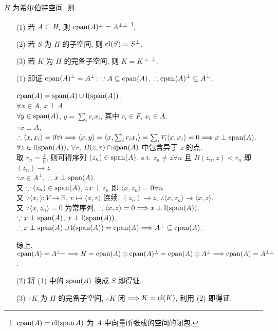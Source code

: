 \documentclass{note}
\begin{document}
\begin{thm}[(课本定理 13.13)]
    $H$ 为希尔伯特空间, 则
    \begin{itemize}
        \item[(1)] 若 $A\subseteq H$, 则 $\operatorname{cpan}(A)^{\perp}=A^{\perp\perp}~$\footnote{$\operatorname{cpan}(A)=\operatorname{cl}(\operatorname{span}{A})$ 为 $A$ 中向量所张成的空间的闭包.}.
        \item[(2)] 若 $S$ 为 $H$ 的子空间, 则 $\operatorname{cl}(S)=S^{\perp}$.
        \item[(3)] 若 $K$ 为 $H$ 的完备子空间, 则 $K=K^{\perp\perp}$.
    \end{itemize}
\end{thm}
\begin{pf}
    \begin{itemize}
        \item[(1)] 即证 $\operatorname{cpan}(A)^{\perp}=A^{\perp}$: $\because A\subseteq\operatorname{cpan}(A)$, $\therefore\operatorname{cpan}(A)^{\perp}\subseteq A^{\perp}$.

        $\operatorname{cpan}(A)=\operatorname{span}(A)\cup\operatorname{l}(\operatorname{span}(A))$.\\
        $\forall x\in A$, $x\perp A$.\\
        $\forall y\in\operatorname{span}(A)$, $y=\sum_ir_ix_i$, 其中 $r_i\in F$, $x_i\in A$.\\
        $\because x\perp A$, $\therefore\langle x,x_i\rangle=0\forall i\Longrightarrow\langle x,y\rangle=\langle x,\sum_ir_ix_i\rangle=\sum_i\overline{r_i}\langle x,x_i\rangle=0\Longrightarrow x\perp\operatorname{span}(A)$.\\
        $\forall z\in\operatorname{l}(\operatorname{span}(A))$, $\forall r$, $B(z,r)\cap\operatorname{span}(A)$ 中包含异于 $z$ 的点.\\
        取 $r_n=\frac{1}{n}$, 则可得序列 $(z_n)\in\operatorname{span}(A)$. s.t. $z_n\neq z\forall n$ 且 $B(z_n,z)<r_n$ 即 $(z_n)\rightarrow z$.\\
        $\because x\in A^{\perp}$, $\therefore x\perp\operatorname{span}(A)$.\\
        又 $\because(z_n)\in\operatorname{span}(A)$, $\therefore x\perp z_n$ 即 $\langle x,z_n\rangle=0\forall n$.\\
        又 $\because\langle x,\rangle:V\rightarrow\mathbb{R}$, $v\mapsto\langle x,v\rangle$ 连续, $(z_n)\rightarrow z$, $\therefore\langle x,z_n\rangle\rightarrow\langle x,z\rangle$.\\
        又 $\because\langle x,z_n\rangle=0$ 为常序列, $\therefore\langle x,z\rangle=0\Longrightarrow x\perp\operatorname{l}(\operatorname{span}(A))$.\\
        $\because x\perp\operatorname{span}(A)$, $x\perp\operatorname{l}(\operatorname{span}(A))$, $\therefore x\perp\operatorname{span}(A)\cup\operatorname{l}(\operatorname{span}(A))=\operatorname{cpan}(A)\Longrightarrow A^{\perp}\subseteq\operatorname{cpan}(A)$.

        综上, $\operatorname{cpan}(A)=A^{\perp\perp}\Longrightarrow H=\operatorname{cpan}(A)\odot\operatorname{cpan}(A)^{\perp}=\operatorname{cpan}(A)\odot A^{\perp}\Longrightarrow\operatorname{cpan}(A)=A^{\perp\perp}$.
        \item[(2)] 将 (1) 中的 $\operatorname{span}(A)$ 换成 $S$ 即得证.
        \item[(3)] $\because K$ 为 $H$ 的完备子空间, $\therefore K$ 闭 $\Longrightarrow K=\operatorname{cl}(K)$, 利用 (2) 即得证.
    \end{itemize}
\end{pf}
\end{document}
